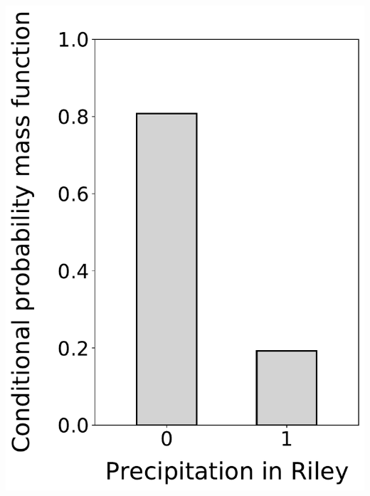 \documentclass[12pt,twoside]{article}
\begin{document}
\begin{enumerate}
\includegraphics[scale=.5]{precipitation_cond_pmf_3_given_1eq1_2eq0.pdf}

\end{enumerate}
\end{document}
